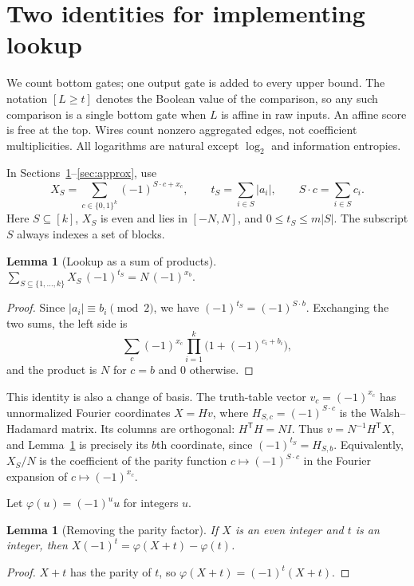 \documentclass[11pt]{article}
\newtheorem{lemma}[theorem]{Lemma}
\newcommand{\bits}{\{0,1\}}
\begin{document}
\section{Two identities for implementing lookup}\label{sec:identities}
We count bottom gates; one output gate is added to every upper bound.
The notation $[L\ge t]$ denotes the Boolean value of the comparison, so
any such comparison is a single bottom gate when $L$ is affine in raw
inputs. An affine score is free at the top. Wires count nonzero aggregated
edges, not coefficient multiplicities. All logarithms are natural except
$\log_2$ and information entropies.

In Sections~\ref{sec:identities}--\ref{sec:approx}, use
$$X_S=\sum_{c\in\bits^k}(-1)^{S\cdot c+x_c},\qquad
 t_S=\sum_{i\in S}|a_i|,\qquad S\cdot c=\sum_{i\in S}c_i.$$
Here $S\subseteq[k]$, $X_S$ is even and lies in $[-N,N]$, and
$0\le t_S\le m|S|$. The subscript $S$ always indexes a set of blocks.
\begin{lemma}[Lookup as a sum of products]\label{lem:lookup}
$\displaystyle\sum_{S\subseteq\{1,\dots,k\}}X_S\,(-1)^{t_S}=N\,(-1)^{x_b}.$
\end{lemma}
\begin{proof}
Since $|a_i|\equiv b_i\pmod2$, we have $(-1)^{t_S}=(-1)^{S\cdot b}$.
Exchanging the two sums, the left side is
$$
\sum_c(-1)^{x_c}\prod_{i=1}^k\bigl(1+(-1)^{c_i+b_i}\bigr),
$$
and the product is $N$ for $c=b$ and $0$ otherwise.
\end{proof}

This identity is also a change of basis. The truth-table vector
$v_c=(-1)^{x_c}$ has unnormalized Fourier coordinates $X=Hv$, where
$H_{S,c}=(-1)^{S\cdot c}$ is the Walsh--Hadamard matrix. Its columns
are orthogonal: $H^{\mathsf T}H=NI$. Thus $v=N^{-1}H^{\mathsf T}X$,
and Lemma~\ref{lem:lookup} is precisely its $b$th coordinate, since
$(-1)^{t_S}=H_{S,b}$. Equivalently, $X_S/N$ is the coefficient of the
parity function $c\mapsto(-1)^{S\cdot c}$ in the Fourier expansion of
$c\mapsto(-1)^{x_c}$.

Let $\varphi(u)=(-1)^u u$ for integers $u$.

\begin{lemma}[Removing the parity factor]\label{lem:parity}
If $X$ is an even integer and $t$ is an integer, then
$X(-1)^t=\varphi(X+t)-\varphi(t)$.
\end{lemma}
\begin{proof}
$X+t$ has the parity of $t$, so $\varphi(X+t)=(-1)^t(X+t)$.
\end{proof}
\end{document}
